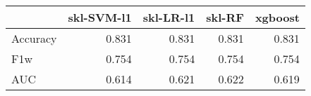 \begin{tabular}{lrrrr}
\toprule
{} &  skl-SVM-l1 &  skl-LR-l1 &  skl-RF &  xgboost \\
\midrule
Accuracy &       0.831 &      0.831 &   0.831 &    0.831 \\
F1w      &       0.754 &      0.754 &   0.754 &    0.754 \\
AUC      &       0.614 &      0.621 &   0.622 &    0.619 \\
\bottomrule
\end{tabular}
